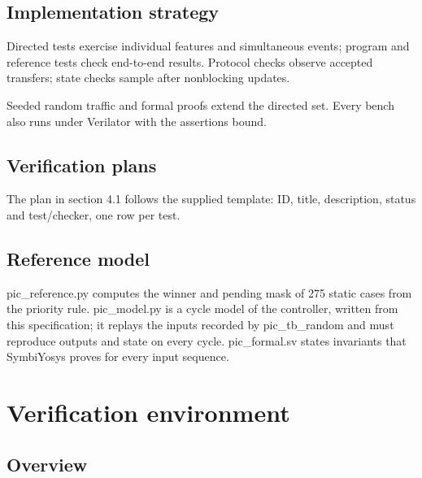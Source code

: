 \documentclass[11pt]{article}
\begin{document}
\subsection{Implementation strategy}
\noindent Directed tests exercise individual features and simultaneous events; program and reference tests check end-to-end results. Protocol checks observe accepted transfers; state checks sample after nonblocking updates.\par\medskip
\noindent Seeded random traffic and formal proofs extend the directed set. Every bench also runs under Verilator with the assertions bound.\par\medskip

\subsection{Verification plans}
\noindent The plan in section 4.1 follows the supplied template: ID, title, description, status and test/checker, one row per test.\par\medskip

\subsection{Reference model}
\noindent pic\_reference.py computes the winner and pending mask of 275 static cases from the priority rule. pic\_model.py is a cycle model of the controller, written from this specification; it replays the inputs recorded by pic\_tb\_random and must reproduce outputs and state on every cycle. pic\_formal.sv states invariants that SymbiYosys proves for every input sequence.\par\medskip

\clearpage
\section{Verification environment}
\subsection{Overview}
\end{document}
